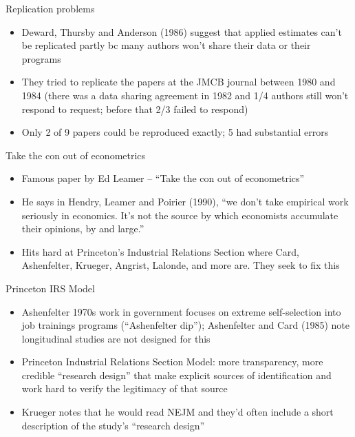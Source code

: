 \documentclass{beamer}
\begin{document}
\begin{frame}{Replication problems}

\begin{itemize}
\item Deward, Thursby and Anderson (1986) suggest that applied estimates can't be replicated partly bc many authors won't share their data or their programs
\item They tried to replicate the papers at the JMCB journal between 1980 and 1984 (there was a data sharing agreement in 1982 and 1/4 authors still won't respond to request; before that 2/3 failed to respond)
\item Only 2 of 9 papers could be reproduced exactly; 5 had substantial errors
\end{itemize}

\end{frame}

\begin{frame}{Take the con out of econometrics}

\begin{itemize}
\item Famous paper by Ed Leamer -- ``Take the con out of econometrics''
\item He says in Hendry, Leamer and Poirier (1990), ``we don't take empirical work seriously in economics. It's not the source by which economists accumulate their opinions, by and large.''
\item Hits hard at Princeton's Industrial Relations Section where Card, Ashenfelter, Krueger, Angrist, Lalonde, and more are. They seek to fix this
\end{itemize}

\end{frame}

\begin{frame}{Princeton IRS Model}

\begin{itemize}
\item Ashenfelter 1970s work in government focuses on extreme self-selection into job trainings programs (``Ashenfelter dip''); Ashenfelter and Card (1985) note longitudinal studies are not designed for this 
\item Princeton Industrial Relations Section Model: more transparency, more credible ``research design'' that make explicit sources of identification and work hard to verify the legitimacy of that source
\item Krueger notes that he would read NEJM and they'd often include a short description of the study's ``research design''
\end{itemize}

\end{frame}
\end{document}

